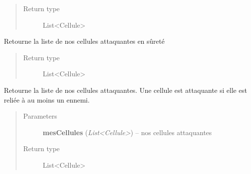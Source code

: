 \documentclass[letterpaper,10pt,english]{sphinxmanual}
\begin{document}
\begin{fulllineitems}
\begin{fulllineitems}
\begin{quote}
\begin{description}
\item[{Return type}] \leavevmode
List\textless{}Cellule\textgreater{}

\end{description}\end{quote}

\end{fulllineitems}


\begin{fulllineitems}
\label{index:StrategieAnalyse.StrategieAnalyse.getAttaquantesEnSurete}
Retourne la liste de nos cellules attaquantes en sûreté
\begin{quote}\begin{description}
\item[{Return type}] \leavevmode
List\textless{}Cellule\textgreater{}

\end{description}\end{quote}

\end{fulllineitems}


\begin{fulllineitems}
\label{index:StrategieAnalyse.StrategieAnalyse.getCellulesAttaquantes}
Retourne la liste de nos cellules attaquantes.
Une cellule est attaquante si elle est reliée à au moins un ennemi.
\begin{quote}\begin{description}
\item[{Parameters}] \leavevmode
\textbf{mesCellules} (\emph{List\textless{}Cellule\textgreater{}}) -- nos cellules attaquantes

\item[{Return type}] \leavevmode
List\textless{}Cellule\textgreater{}

\end{description}\end{quote}

\end{fulllineitems}



\end{fulllineitems}
\end{document}
